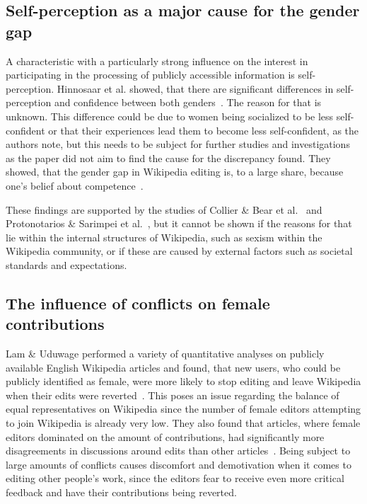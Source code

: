 \documentclass[a4paper, 11pt]{article}
\begin{document}
\subsection{Self-perception as a major cause for the gender gap} \label{sec:gender-gap-wikipedia:self-perception}
A characteristic with a particularly strong influence on the interest in participating in the processing of publicly accessible information is self-perception. Hinnosaar et al. showed, that there are significant differences in self-perception and confidence between both genders~\cite{hinnosaar2019gender}. The reason for that is unknown. This difference could be due to women being socialized to be less self-confident or that their experiences lead them to become less self-confident, as the authors note, but this needs to be subject for further studies and investigations as the paper did not aim to find the cause for the discrepancy found. They showed, that the gender gap in Wikipedia editing is, to a large share, because one’s belief about competence~\cite{hinnosaar2019gender}.

These findings are supported by the studies of Collier \& Bear et al.~\cite{collier2012conflict} and Protonotarios \& Sarimpei et al.~\cite{protonotarios2016similar}, but it cannot be shown if the reasons for that lie within the internal structures of Wikipedia, such as sexism within the Wikipedia community, or if these are caused by external factors such as societal standards and expectations.

\subsection{The influence of conflicts on female contributions} \label{sec:gender-gap-wikipedia:conflicts}
Lam \& Uduwage performed a variety of quantitative analyses on publicly available English Wikipedia articles and found, that new users, who could be publicly identified as female, were more likely to stop editing and leave Wikipedia when their edits were reverted~\cite{lam2011wp}. This poses an issue regarding the balance of equal representatives on Wikipedia since the number of female editors attempting to join Wikipedia is already very low. They also found that articles, where female editors dominated on the amount of contributions, had significantly more disagreements in discussions around edits than other articles~\cite{lam2011wp}. Being subject to large amounts of conflicts causes discomfort and demotivation when it comes to editing other people’s work, since the editors fear to receive even more critical feedback and have their contributions being reverted.
\end{document}
